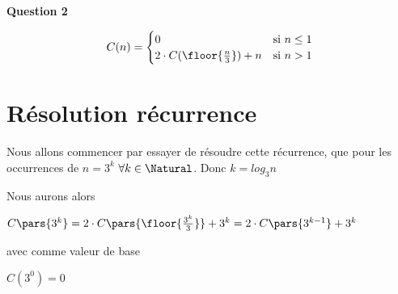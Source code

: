 \documentclass[class=article]{standalone}
\begin{document}
\centerline{\Huge \bf Question 2}
\bigskip


\[
  C(n) =
  \begin{cases}
    0 & \text{si } n \leq 1 \\
    2 \cdot C(\floor{\frac{n}{3}}) + n & \text{si } n > 1 \\
  \end{cases}
\]

\section*{Résolution récurrence}
Nous allons commencer par essayer de résoudre cette récurrence, que pour les 
occurrences de $n = 3^k$ $\forall k \in \Natural$. Donc $k = log_3 n$

Nous aurons alors 

$C\pars{3^k} =
2 \cdot C\pars{\floor{\frac{3^k}{3}}} + 3^k =
2 \cdot C\pars{3^{k-1}}+3^k$

avec comme valeur de base

$C(3^0) = 0$
\end{document}
